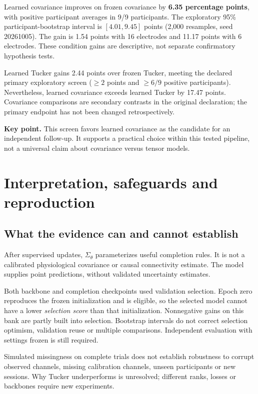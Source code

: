 \documentclass[11pt,a4paper]{article}
\newcommand{\takeaway}[1]{\par\smallskip\noindent\colorbox{pale}{\parbox{\dimexpr\linewidth-2\fboxsep\relax}{\textbf{Key point.} #1}}\par\smallskip}
\begin{document}
Learned covariance improves on frozen covariance by \textbf{6.35 percentage
points}, with positive participant averages in 9/9 participants. The exploratory
95\% participant-bootstrap interval is $[4.01,9.45]$ points (2,000 resamples,
seed 20261005). The gain is 1.54 points with 16 electrodes and 11.17 points
with 6 electrodes. These condition gains are descriptive, not separate
confirmatory hypothesis tests.

Learned Tucker gains 2.44 points over frozen Tucker, meeting the declared
primary exploratory screen ($\geq2$ points and $\geq6/9$ positive participants).
Nevertheless, learned covariance exceeds learned Tucker by 17.47 points.
Covariance comparisons are secondary contrasts in the original declaration;
the primary endpoint has not been changed retrospectively.

\takeaway{This screen favors learned covariance as the candidate for an
independent follow-up. It supports a practical choice within this tested
pipeline, not a universal claim about covariance versus tensor models.}

\newpage
\section{Interpretation, safeguards and reproduction}
\subsection{What the evidence can and cannot establish}
After supervised updates, $\Sigma_\theta$ parameterizes useful completion rules.
It is not a calibrated physiological covariance or causal connectivity estimate.
The model supplies point predictions, without validated uncertainty estimates.

Both backbone and completion checkpoints used validation selection. Epoch zero
reproduces the frozen initialization and is eligible, so the selected model
cannot have a lower \emph{selection score} than that initialization. Nonnegative
gains on this bank are partly built into selection. Bootstrap intervals do not
correct selection optimism, validation reuse or multiple comparisons.
Independent evaluation with settings frozen is still required.

Simulated missingness on complete trials does not establish robustness to corrupt
observed channels, missing calibration channels, unseen participants or new
sessions. Why Tucker underperforms is unresolved; different ranks, losses or
backbones require new experiments.
\end{document}
